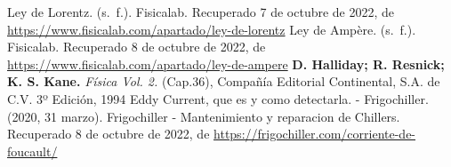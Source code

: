 \documentclass[]{article}
\begin{document}
\begin{multicols*}{2}
\begin{thebibliography}{5}
      Ley de Lorentz. (s. f.). Fisicalab. Recuperado 7 de octubre de 2022, 
    de \url{https://www.fisicalab.com/apartado/ley-de-lorentz}
    Ley de Ampère. (s. f.). Fisicalab. Recuperado 8 de octubre de 2022, 
    de \url{https://www.fisicalab.com/apartado/ley-de-ampere}
     \textbf{D. Halliday; R. Resnick; K. S. Kane.} \textit{Física Vol. 2.} (Cap.36), Compañía Editorial Continental, S.A. de C.V. 3º Edición, 1994
     Eddy Current, que es y como detectarla. - Frigochiller. (2020, 31 marzo). Frigochiller - Mantenimiento y reparacion de Chillers. Recuperado 8 de octubre de 2022, 
    de \url{https://frigochiller.com/corriente-de-foucault/}
\end{thebibliography}
\end{multicols*}
\end{document}
